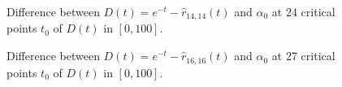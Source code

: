 \begin{figure}[!ht]
\centering
\resizebox{0.9\textwidth}{!}{}
\caption{Difference between $D(t) = e^{-t} - \hat{r}_{14,14}(t)$ and $\alpha_0$ at 24 critical points
$t_0$ of $D(t)$ in $[0, 100]$.}
\label{fig:pusa-differences-errors-14}
\end{figure}

\begin{figure}[!ht]
\centering
\resizebox{0.9\textwidth}{!}{}
\caption{Difference between $D(t) = e^{-t} - \hat{r}_{16,16}(t)$ and $\alpha_0$ at 27 critical points
$t_0$ of $D(t)$ in $[0, 100]$.}
\label{fig:pusa-differences-errors-16}
\end{figure}
